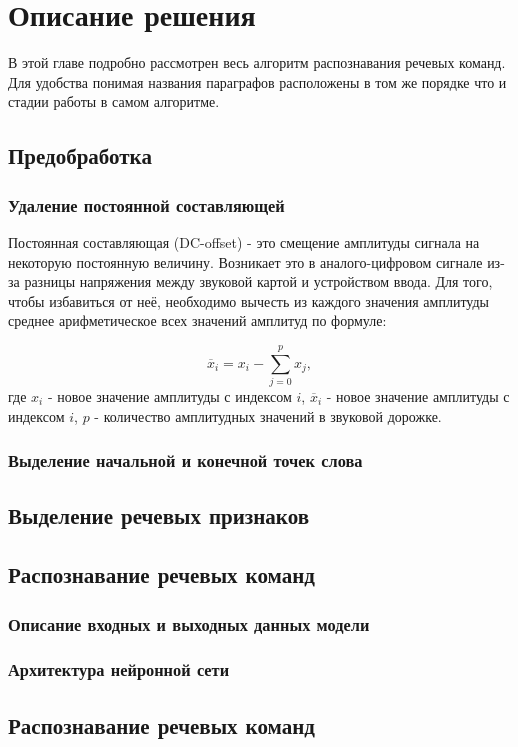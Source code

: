 \section{Описание решения}
В этой главе подробно рассмотрен весь алгоритм распознавания речевых команд. Для удобства понимая названия параграфов расположены в том же порядке что и стадии работы в самом алгоритме.

\subsection{Предобработка}
\subsubsection{Удаление постоянной составляющей}
Постоянная составляющая (DC-offset) - это смещение амплитуды сигнала на некоторую постоянную величину. Возникает это в аналого-цифровом сигнале из-за разницы напряжения между звуковой картой и устройством ввода. Для того, чтобы избавиться от неё, необходимо вычесть из каждого значения амплитуды среднее арифметическое всех значений амплитуд по формуле:

\begin{equation}
\overline{x}_i=x_i - \sum_{j=0}^{p} x_j,
\end{equation}
где $x_i$ - новое значение амплитуды с индексом $i$, $\overline{x}_i$ - новое значение амплитуды с индексом $i$, $p$ - количество амплитудных значений в звуковой дорожке. 


\subsubsection{Выделение начальной и конечной точек слова}

\subsection{Выделение речевых признаков}



\subsection{Распознавание речевых команд}
\subsubsection{Описание входных и выходных данных модели}
\subsubsection{Архитектура нейронной сети}
\subsubsection{}


\subsection{Распознавание речевых команд}